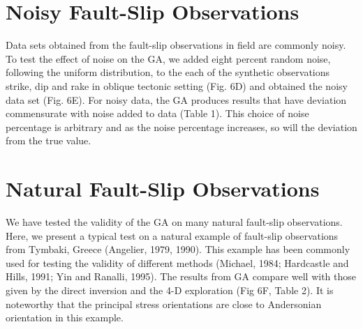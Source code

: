 \section{Noisy Fault-Slip Observations}
Data sets obtained from the fault-slip observations in field are commonly noisy. To test the effect of noise on the GA, we added eight percent random noise, following the uniform distribution, to the each of the synthetic observations strike, dip and rake in oblique tectonic setting (Fig. 6D) and obtained the noisy data set (Fig. 6E). For noisy data, the GA produces results that have deviation commensurate with noise added to data (Table 1). This choice of noise percentage is arbitrary and as the noise percentage increases, so will the deviation from the true value.

\section{Natural Fault-Slip Observations}
We have tested the validity of the GA on many natural fault-slip observations. Here, we present a typical test on a natural example of fault-slip observations from Tymbaki, Greece (Angelier, 1979, 1990). This example has been commonly used for testing the validity of different methods (Michael, 1984; Hardcastle and Hills, 1991; Yin and Ranalli, 1995). The results from GA compare well with those given by the direct inversion and the 4-D exploration (Fig 6F, Table 2). It is noteworthy that the principal stress orientations are close to Andersonian orientation in this example.

